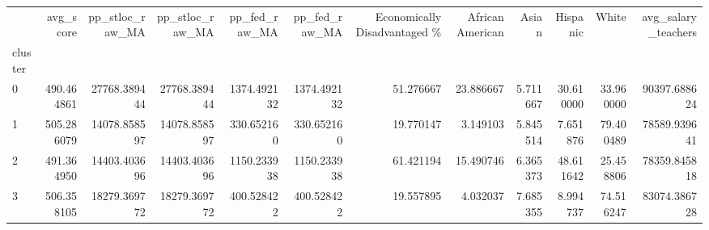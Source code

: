 \begin{tabular}{lrrrrrrrrrrr}
\toprule
{} &   avg\_score &  pp\_stloc\_raw\_MA &  pp\_stloc\_raw\_MA &  pp\_fed\_raw\_MA &  pp\_fed\_raw\_MA &  Economically Disadvantaged \% &  African American &     Asian &   Hispanic &      White &  avg\_salary\_teachers \\
cluster &             &                  &                  &                &                &                               &                   &           &            &            &                      \\
\midrule
0       &  490.464861 &     27768.389444 &     27768.389444 &    1374.492132 &    1374.492132 &                     51.276667 &         23.886667 &  5.711667 &  30.610000 &  33.960000 &         90397.688624 \\
1       &  505.286079 &     14078.858597 &     14078.858597 &     330.652160 &     330.652160 &                     19.770147 &          3.149103 &  5.845514 &   7.651876 &  79.400489 &         78589.939641 \\
2       &  491.364950 &     14403.403696 &     14403.403696 &    1150.233938 &    1150.233938 &                     61.421194 &         15.490746 &  6.365373 &  48.611642 &  25.458806 &         78359.845818 \\
3       &  506.358105 &     18279.369772 &     18279.369772 &     400.528422 &     400.528422 &                     19.557895 &          4.032037 &  7.685355 &   8.994737 &  74.516247 &         83074.386728 \\
\bottomrule
\end{tabular}
